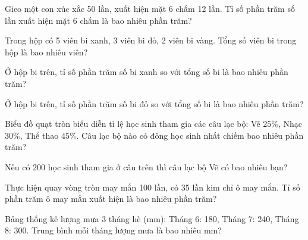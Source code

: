 \begin{ex}
  Gieo một con xúc xắc 50 lần, xuất hiện mặt 6 chấm 12 lần. Tỉ số phần trăm số lần xuất hiện mặt 6 chấm là bao nhiêu phần trăm?
\end{ex}

\begin{ex}
  Trong hộp có 5 viên bi xanh, 3 viên bi đỏ, 2 viên bi vàng. Tổng số viên bi trong hộp là bao nhiêu viên?
\end{ex}

\begin{ex}
  Ở hộp bi trên, tỉ số phần trăm số bi xanh so với tổng số bi là bao nhiêu phần trăm?
\end{ex}

\begin{ex}
  Ở hộp bi trên, tỉ số phần trăm số bi đỏ so với tổng số bi là bao nhiêu phần trăm?
\end{ex}

\begin{ex}
  Biểu đồ quạt tròn biểu diễn tỉ lệ học sinh tham gia các câu lạc bộ: Vẽ $25\%$, Nhạc $30\%$, Thể thao $45\%$. Câu lạc bộ nào có đông học sinh nhất chiếm bao nhiêu phần trăm?
\end{ex}

\begin{ex}
  Nếu có 200 học sinh tham gia ở câu trên thì câu lạc bộ Vẽ có bao nhiêu bạn?
\end{ex}

\begin{ex}
  Thực hiện quay vòng tròn may mắn 100 lần, có 35 lần kim chỉ ô may mắn. Tỉ số phần trăm ô may mắn xuất hiện là bao nhiêu phần trăm?
\end{ex}

\begin{ex}
  Bảng thống kê lượng mưa 3 tháng hè (mm): Tháng 6: 180, Tháng 7: 240, Tháng 8: 300. Trung bình mỗi tháng lượng mưa là bao nhiêu mm?
\end{ex}

